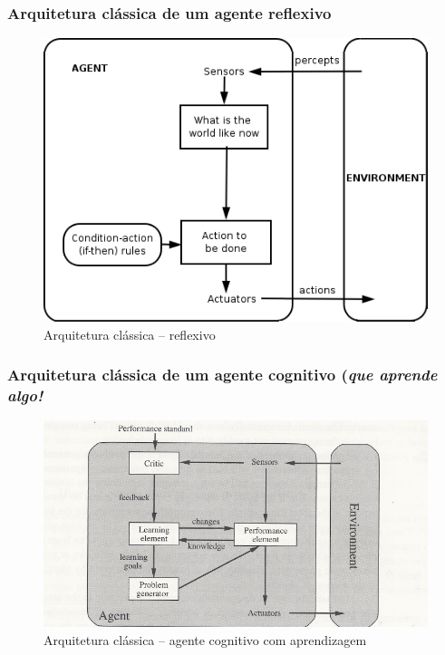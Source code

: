 \begin{frame}

  \frametitle{Arquitetura clássica de um agente reflexivo}
    
\begin{figure}[!ht]
\centering
\includegraphics[width=.6\textwidth]{figuras/agente_reflexivo.png}
\caption{Arquitetura clássica -- reflexivo}
\label{ag_01}
\end{figure}
    
\end{frame}

\begin{frame}

  \frametitle{Arquitetura clássica de um agente cognitivo (\textit{que aprende algo!}}
    
\begin{figure}[!ht]
\centering
\includegraphics[height =.6\textheight,width=.7\textwidth]{figuras/agente_aprendizagem.pdf}
\caption{Arquitetura clássica -- agente cognitivo com aprendizagem}
\label{ag_02}
\end{figure}
    
\end{frame}



